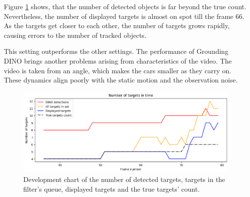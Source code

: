 Figure \ref{gr:E1-V1-S3} shows, that the number of detected objects is far beyond the true count. Nevertheless,
the number of displayed targets is almost on spot till the frame 66. As the targets get closer to each
other, the
number of targets grows rapidly, causing errors to the number of tracked objects.

This setting outperforms the other settings. The performance of Grounding DINO brings another problems arising from
characteristics of the video. The video is taken from an angle, which makes the cars smaller as they carry on. These
dynamics align poorly with the static motion and the observation noise.

\begin{figure}[H]
    \centering
    \includegraphics[width=\linewidth]{../../../experiments/E1/V1/DINO/dino_det}
    \caption{Development chart of the number of detected targets, targets in the filter's queue, displayed targets
    and the
    true
    targets' count.}
    \label{gr:E1-V1-S3}
\end{figure}

